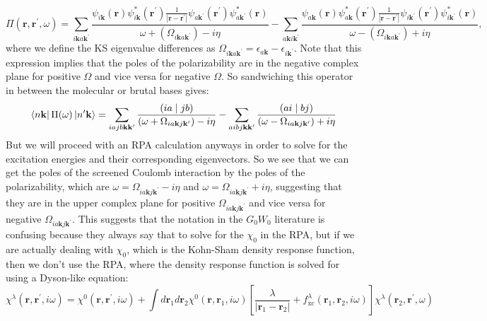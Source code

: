\documentclass[12pt]{article}
\begin{document}
\begin{equation}
\Pi\left(\mathbf{r}, \mathbf{r}^{\prime}, \omega\right)=\sum_{i\mathbf{k}a\mathbf{k}^{\prime}}\frac{\psi_{i\mathbf{k} }(\mathbf{r}) \psi_{i\mathbf{k}}^{*}\left(\mathbf{r}^{\prime}\right)\frac{1}{|\mathbf{r}-\mathbf{r}^\prime|} \psi_{a\mathbf{k}^{\prime}}\left(\mathbf{r}^{\prime}\right) \psi_{a\mathbf{k}^{\prime}}^{*}(\mathbf{r})}{\omega+\left(\Omega_{i\mathbf{k}a\mathbf{k}^{\prime}}\right)-i\eta } - \sum_{a\mathbf{k}i\mathbf{k}^{\prime}}\frac{\psi_{a\mathbf{k}}(\mathbf{r}) \psi_{a\mathbf{k}}^{*}\left(\mathbf{r}^{\prime}\right) \frac{1}{|\mathbf{r}-\mathbf{r}^\prime|}\psi_{i\mathbf{k}^{\prime}}\left(\mathbf{r}^{\prime}\right) \psi_{i\mathbf{k}^{\prime}}^{*}(\mathbf{r})}{\omega-\left(\Omega_{i\mathbf{k}a\mathbf{k}^{\prime}}\right)+i\eta },
\end{equation}
where we define the KS eigenvalue differences as \(\Omega_{i\mathbf{k}a\mathbf{k}^{\prime}} = \epsilon_{a\mathbf{k}} - \epsilon_{i\mathbf{k}^{\prime}}\). Note that this expression implies that the poles of the polarizability are in the negative complex plane for positive $\Omega $ and vice versa for negative $\Omega $. So sandwiching this operator in between the molecular or brutal bases gives:
\begin{equation}
    \bra{n\mathbf{k}} \Pi (\omega) \ket{n^\prime\mathbf{k}} = \sum_{iajb \mathbf{k} \mathbf{k}^{\prime}} \frac{(ia\mid jb)}{(\omega + \Omega_{ia\mathbf{k}j\mathbf{k}^{\prime}})-i\eta} - \sum_{aibj \mathbf{k} \mathbf{k}^{\prime}} \frac{(ai\mid bj)}{(\omega - \Omega_{ia\mathbf{k}j\mathbf{k}^{\prime}})+i\eta}
\end{equation}
But we will proceed with an RPA calculation anyways in order to solve for the excitation energies and their corresponding eigenvectors. So we see that we can get the poles of the screened Coulomb interaction by the poles of the polarizability, which are $\omega = \Omega_{ia\mathbf{k}j\mathbf{k}^{\prime}} - i\eta$ and $\omega = \Omega_{ia\mathbf{k}j\mathbf{k}^{\prime}} + i\eta$, suggesting that they are in the upper complex plane for positive $\Omega_{ia\mathbf{k}j\mathbf{k}^{\prime}}$ and vice versa for negative $\Omega_{ia\mathbf{k}j\mathbf{k}^{\prime}}$. This suggests that the notation in the $G_0W_0$ literature is confusing because they always say that to solve for the $\chi_0$ in the RPA, but if we are actually dealing with $\chi_0$, which is the Kohn-Sham density response function, then we don't use the RPA, where the density response function is solved for using a Dyson-like equation:
\begin{equation}\label{eq:dyson}
    \chi^{\lambda}\left(\mathbf{r}, \mathbf{r}^{\prime}, i \omega\right) = \chi^{0}\left(\mathbf{r}, \mathbf{r}^{\prime}, i \omega\right) 
    + \int d \mathbf{r}_{1} d \mathbf{r}_{2} \chi^{0}\left(\mathbf{r}, \mathbf{r}_{1}, i \omega\right)\left[\frac{\lambda}{\left|\mathbf{r}_{1}-\mathbf{r}_{2}\right|}+f_{\mathrm{xc}}^{\lambda}\left(\mathbf{r}_{1}, \mathbf{r}_{2}, i \omega\right)\right] \chi^{\lambda}\left(\mathbf{r}_{2}, \mathbf{r}^{\prime}, \omega\right)
\end{equation}
\end{document}
